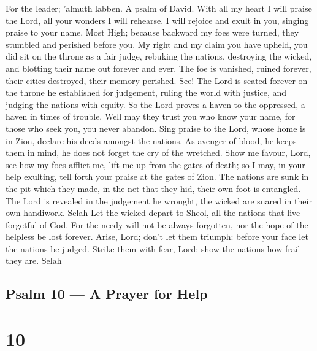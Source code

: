 For the leader; 'almuth labben. A psalm of David.  With all
my heart I will praise the Lord, all your wonders I will rehearse.
 I will rejoice and exult in you, singing praise to your
name, Most High;  because backward my foes were turned, they
stumbled and perished before you.  My right and my claim you
have upheld, you did sit on the throne as a fair judge, 
rebuking the nations, destroying the wicked, and blotting their name out
forever and ever.  The foe is vanished, ruined forever,
their cities destroyed, their memory perished.  See! The
Lord is seated forever on the throne he established for judgement,
 ruling the world with justice, and judging the nations with
equity.  So the Lord proves a haven to the oppressed, a
haven in times of trouble.  Well may they trust you who
know your name, for those who seek you, you never abandon. 
Sing praise to the Lord, whose home is in Zion, declare his deeds
amongst the nations.  As avenger of blood, he keeps them in
mind, he does not forget the cry of the wretched.  Show me
favour, Lord, see how my foes afflict me, lift me up from the gates of
death;  so I may, in your help exulting, tell forth your
praise at the gates of Zion.  The nations are sunk in the
pit which they made, in the net that they hid, their own foot is
entangled.  The Lord is revealed in the judgement he
wrought, the wicked are snared in their own handiwork. Selah
 Let the wicked depart to Sheol, all the nations that live
forgetful of God.  For the needy will not be always
forgotten, nor the hope of the helpless be lost forever. 
Arise, Lord; don't let them triumph: before your face let the nations be
judged.  Strike them with fear, Lord: show the nations how
frail they are. Selah

\hypertarget{psalm-10-a-prayer-for-help}{%
\subsection{Psalm 10 --- A Prayer for
Help}\label{psalm-10-a-prayer-for-help}}

\hypertarget{section-9}{%
\section{10}\label{section-9}}

